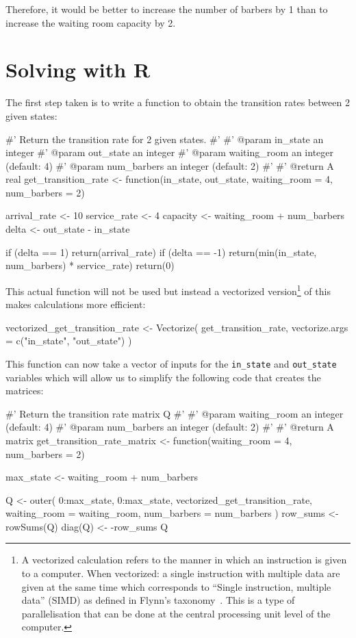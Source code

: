 Therefore, it would be better to increase the number of barbers by 1
than to increase the waiting room capacity by 2.

\section{Solving with R}\label{sec:markov_chains_solving-with-R}

The first step taken is to write a function to obtain the transition rates
between 2 given states:

\begin{Rin}
#' Return the transition rate for 2 given states.
#'
#' @param in_state an integer
#' @param out_state an integer
#' @param waiting_room an integer (default: 4)
#' @param num_barbers an integer  (default: 2)
#'
#' @return A real
get_transition_rate <- function(in_state,
                                out_state,
                                waiting_room = 4,
                                num_barbers = 2) {
  arrival_rate <- 10
  service_rate <- 4
  capacity <- waiting_room + num_barbers
  delta <- out_state - in_state

  if (delta == 1) {
    return(arrival_rate)
  }
  if (delta == -1) {
    return(min(in_state, num_barbers) * service_rate)
  }
  return(0)
}
\end{Rin}


This actual function will not be used but instead a vectorized
version\footnote{
A vectorized calculation refers to the manner in which an instruction is given
to a computer. When vectorized: a single instruction with multiple
data are given at the same time
which corresponds to ``Single instruction, multiple data'' (SIMD) as defined in
Flynn's taxonomy~\cite{flynn1966very}. This is a type of parallelisation
that can be done at the central processing unit level of the computer. }
of this
makes calculations more efficient:

\begin{Rin}
vectorized_get_transition_rate <- Vectorize(
  get_transition_rate,
  vectorize.args = c("in_state", "out_state")
)
\end{Rin}

This function can now take a vector of inputs for the \texttt{in_state}
and \texttt{out_state} variables which will allow us to simplify the
following code that creates the matrices:

\begin{Rin}
#' Return the transition rate matrix Q
#'
#' @param waiting_room an integer (default: 4)
#' @param num_barbers an integer (default: 2)
#'
#' @return A matrix
get_transition_rate_matrix <- function(waiting_room = 4,
                                       num_barbers = 2){
  max_state <- waiting_room + num_barbers

  Q <- outer(
    0:max_state,
    0:max_state,
    vectorized_get_transition_rate,
    waiting_room = waiting_room,
    num_barbers = num_barbers
  )
  row_sums <- rowSums(Q)
  diag(Q) <- -row_sums
  Q
}
\end{Rin}


